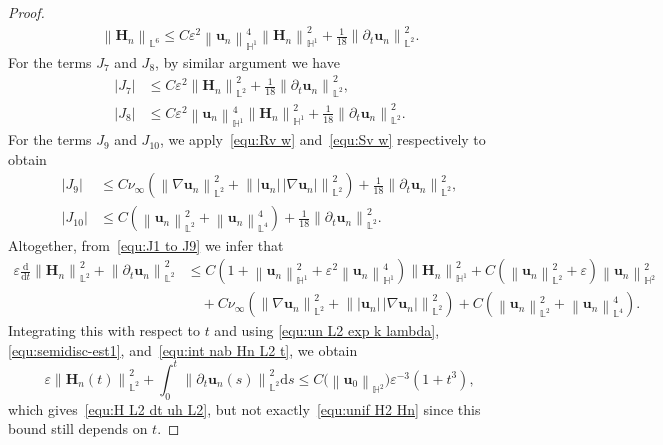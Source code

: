 \documentclass[11pt, reqno]{amsart}
\theoremstyle{definition}
\numberwithin{equation}{section}
\newcommand{\bff}{\boldsymbol}
\newcommand{\bb}{\mathbb}
\newcommand{\ddt}{\frac{\mathrm{d}}{\mathrm{d}t}}
\newcommand{\ds}{\mathrm{d}s}
\newcommand{\norm}[2]{\left\|{#1}\right\|_{#2}}
\newcommand{\abs}[1]{\left|{#1}\right|}
\begin{document}
\begin{proof}
\begin{align*}
		\norm{\bff{H}_n}{\bb{L}^6}
        \leq
        C\varepsilon^2 \norm{\bff{u}_n}{\bb{H}^1}^4 \norm{\bff{H}_n}{\bb{H}^1}^2
        +
        \frac{1}{18} \norm{\partial_t \bff{u}_n}{\bb{L}^2}^2.
    \end{align*}
    For the terms $J_7$ and $J_8$, by similar argument we have
    \begin{align*}
        \abs{J_7}
        &\leq
        C\varepsilon^2 \norm{\bff{H}_n}{\bb{L}^2}^2
        +
        \frac{1}{18} \norm{\partial_t \bff{u}_n}{\bb{L}^2}^2,
        \\
        \abs{J_8}
        &\leq
        C \varepsilon^2 \norm{\bff{u}_n}{\bb{H}^1}^4 \norm{\bff{H}_n}{\bb{H}^1}^2
        +
        \frac{1}{18} \norm{\partial_t \bff{u}_n}{\bb{L}^2}^2.
    \end{align*}
    For the terms $J_9$ and $J_{10}$, we apply~\eqref{equ:Rv w} and~\eqref{equ:Sv w} respectively to obtain
    \begin{align*}
   		\abs{J_9}
   		&\leq
   		C \nu_\infty
   		\left( \norm{\nabla \bff{u}_n}{\bb{L}^2}^2
   		+
   		\norm{|\bff{u}_n|\, |\nabla \bff{u}_n|}{\bb{L}^2}^2 \right)
   		+
   		\frac{1}{18} \norm{\partial_t \bff{u}_n}{\bb{L}^2}^2,
   		\\
   		\abs{J_{10}}
   		&\leq
   		C\left(\norm{\bff{u}_n}{\bb{L}^2}^2 +\norm{\bff{u}_n}{\bb{L}^4}^4\right) 
   		+
   		\frac{1}{18} \norm{\partial_t \bff{u}_n}{\bb{L}^2}^2.
   	\end{align*}
   Altogether, from~\eqref{equ:J1 to J9} we infer that
	\begin{align}\label{equ:eps Hn L2 dt un}
		\varepsilon \ddt \norm{\bff{H}_n}{\bb{L}^2}^2
		+
		\norm{\partial_t \bff{u}_n}{\bb{L}^2}^2
		&\leq
		C\left(1+\norm{\bff{u}_n}{\bb{H}^1}^2 + \varepsilon^2 \norm{\bff{u}_n}{\bb{H}^1}^4 \right) \norm{\bff{H}_n}{\bb{H}^1}^2
		+
		C \left(\norm{\bff{u}_n}{\bb{L}^2}^2+\varepsilon \right) \norm{\bff{u}_n}{\bb{H}^2}^2
		\nonumber\\
		&\quad
		+
		C \nu_\infty
		\left( \norm{\nabla \bff{u}_n}{\bb{L}^2}^2
		+
		\norm{|\bff{u}_n|\, |\nabla \bff{u}_n|}{\bb{L}^2}^2 \right)
		+
		C\left(\norm{\bff{u}_n}{\bb{L}^2}^2 +\norm{\bff{u}_n}{\bb{L}^4}^4\right).
	\end{align}
	Integrating this with respect to $t$ and using \eqref{equ:un L2 exp k lambda}, \eqref{equ:semidisc-est1}, and~\eqref{equ:int nab Hn L2 t}, we obtain
    \begin{equation}\label{equ:Hn small t L2}
        \varepsilon \norm{\bff{H}_n(t)}{\bb{L}^2}^2
        + 
        \int_0^t \norm{\partial_t \bff{u}_n(s)}{\bb{L}^2}^2 \ds
		\leq 
		C\big(\norm{\bff{u}_0}{\bb{H}^2}\big) \varepsilon^{-3}  \left(1+t^3\right),
    \end{equation}
    which gives~\eqref{equ:H L2 dt uh L2}, but not exactly~\eqref{equ:unif H2 Hn} since this bound still depends on $t$. 


\end{proof}
\end{document}
